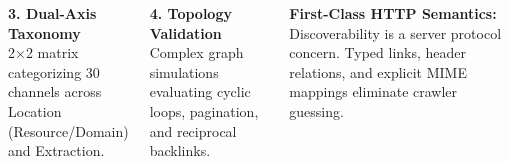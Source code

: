 \documentclass[
  25pt,
  a0paper,
  portrait,
  margin=0mm,
  innermargin=15mm,
  blockverticalspace=7mm,
  colspace=10mm,
  subcolspace=8mm
]{tikzposter}
\begin{document}
\begin{columns}
{    \vspace{0.14cm}
    \noindent
    \begin{minipage}{0.488\linewidth}
      \begin{tcolorbox}[colback=vlizHeroBg,colframe=vlizBorder,arc=3.5mm,boxrule=1.4pt,left=4mm,right=4mm,top=2.2mm,bottom=2.2mm,height=4.8cm]
        {\color{vlizNavy}\bfseries 3. Dual-Axis Taxonomy}\\[2pt]
        {\footnotesize 2$\times$2 matrix categorizing 30 channels across Location (Resource/Domain) and Extraction.}
      \end{tcolorbox}
    \end{minipage}\hfill
    \begin{minipage}{0.488\linewidth}
      \begin{tcolorbox}[colback=vlizHeroBg,colframe=vlizBorder,arc=3.5mm,boxrule=1.4pt,left=4mm,right=4mm,top=2.2mm,bottom=2.2mm,height=4.8cm]
        {\color{vlizNavy}\bfseries 4. Topology Validation}\\[2pt]
        {\footnotesize Complex graph simulations evaluating cyclic loops, pagination, and reciprocal backlinks.}
      \end{tcolorbox}
    \end{minipage}

    \vspace{0.14cm}
    \begin{tcolorbox}[colback=vlizLightTeal,colframe=vlizTeal,arc=4mm,boxrule=1.5pt,left=5mm,right=5mm,top=2.5mm,bottom=2.5mm]
      {\color{vlizNavy}\bfseries First-Class HTTP Semantics:} {\small Discoverability is a server protocol concern. Typed links, header relations, and explicit MIME mappings eliminate crawler guessing.}
    \end{tcolorbox}
    \vspace*{1.5mm}
  }


\end{columns}
\end{document}
